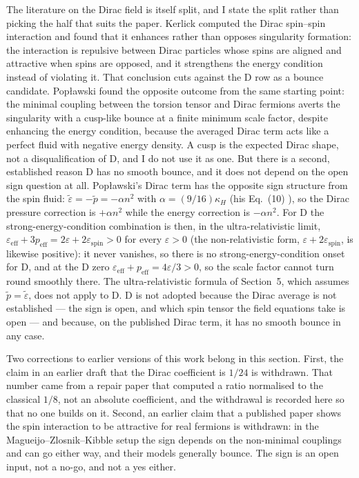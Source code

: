 \documentclass[11pt]{article}
\begin{document}
The literature on the Dirac field is itself split, and I state the split
rather than picking the half that suits the paper. Kerlick
\cite{Kerlick75} computed the Dirac spin--spin interaction and found
that it enhances rather than opposes singularity formation: the
interaction is repulsive between Dirac particles whose spins are aligned
and attractive when spins are opposed, and it strengthens the energy
condition instead of violating it. That conclusion cuts against the D
row as a bounce candidate. Pop{\l}awski \cite{Poplawski12} found the
opposite outcome from the same starting point: the minimal coupling
between the torsion tensor and Dirac fermions averts the singularity
with a cusp-like bounce at a finite minimum scale factor, despite
enhancing the energy condition, because the averaged Dirac term acts
like a perfect fluid with negative energy density. A cusp is the
expected Dirac shape, not a disqualification of D, and I do not use it
as one. But there is a second, established reason D has no smooth
bounce, and it does not depend on the open sign question at all.
Pop{\l}awski's Dirac term has the opposite sign structure from the spin
fluid: $\tilde\varepsilon = -\tilde p = -\alpha n^2$ with
$\alpha = (9/16)\kappa_H$ (his Eq.~(10) \cite{Poplawski12}), so the
Dirac pressure correction is $+\alpha n^2$ while the energy correction
is $-\alpha n^2$. For D the strong-energy-condition combination is then, in the
ultra-relativistic limit,
$\varepsilon_{\mathrm{eff}} + 3p_{\mathrm{eff}} = 2\varepsilon +
2\varepsilon_{\mathrm{spin}} > 0$ for every $\varepsilon > 0$ (the
non-relativistic form, $\varepsilon + 2\varepsilon_{\mathrm{spin}}$, is
likewise positive): it never
vanishes, so there is no strong-energy-condition onset for D, and at the
D zero $\varepsilon_{\mathrm{eff}} + p_{\mathrm{eff}} = 4\varepsilon/3 >
0$, so the scale factor cannot turn round smoothly there. The
ultra-relativistic formula of Section~5, which assumes
$\tilde p = \tilde\varepsilon$, does not apply to D. D is not adopted
because the Dirac average is not established --- the sign is open, and
which spin tensor the field equations take is open --- and because, on
the published Dirac term, it has no smooth bounce in any case.

Two corrections to earlier versions of this work belong in this section.
First, the claim in an earlier draft that the Dirac coefficient is
$1/24$ is withdrawn. That number came from a repair paper that computed
a ratio normalised to the classical $1/8$, not an absolute coefficient,
and the withdrawal is recorded here so that no one builds on it.
Second, an earlier claim that a published paper shows the spin
interaction to be attractive for real fermions is withdrawn: in the
Magueijo--Zlosnik--Kibble setup \cite{MZK13} the sign depends on the
non-minimal couplings and can go either way, and their models generally
bounce. The sign is an open input, not a no-go, and not a yes either.
\end{document}
